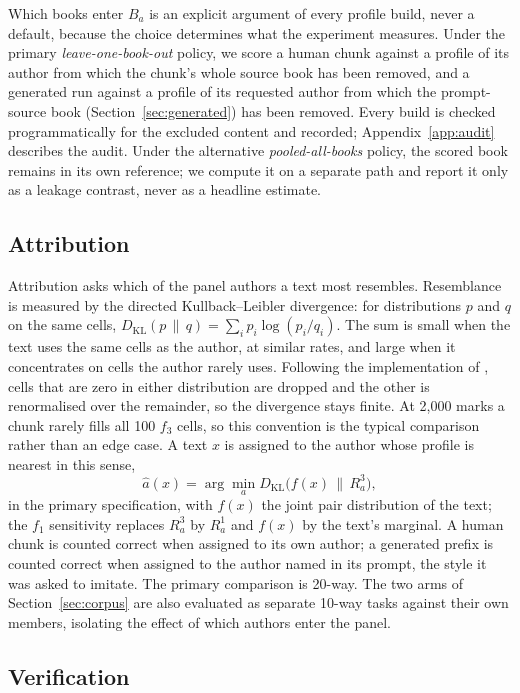 \documentclass[11pt]{article}
\newcommand{\fOne}{\ensuremath{f_1}\xspace}
\newcommand{\fThree}{\ensuremath{f_3}\xspace}
\newcommand{\KL}{D_{\mathrm{KL}}}
\begin{document}
Which books enter \(B_a\) is an explicit argument of every profile build,
never a default, because the choice determines what the experiment
measures.  Under the primary \emph{leave-one-book-out} policy, we score a
human chunk against a profile of its author from which the chunk's whole
source book has been removed, and a generated run against a profile of its
requested author from which the prompt-source book
(Section~\ref{sec:generated}) has been removed.  Every build is checked
programmatically for the excluded content and recorded;
Appendix~\ref{app:audit} describes the audit.  Under
the alternative \emph{pooled-all-books} policy, the scored book remains in
its own reference; we compute it on a separate path and report it only as a
leakage contrast, never as a headline estimate.

\subsection{Attribution}
\label{sec:attribution}

Attribution asks which of the panel authors a text most resembles.
Resemblance is measured by the directed Kullback--Leibler divergence: for
distributions \(p\) and \(q\) on the same cells,
\(\KL(p\,\|\,q) = \sum_i p_i \log(p_i/q_i)\).  The sum is small when the
text uses the same cells as the author, at similar rates, and large when it
concentrates on cells the author rarely uses.  Following the
implementation of \cite{darmon2021}, cells that are zero in either
distribution are dropped and the other is renormalised over the remainder,
so the divergence stays finite.  At 2,000 marks a chunk rarely fills all
100 \fThree cells, so this convention is the typical comparison rather than
an edge case.  A text \(x\) is assigned to the author whose profile is
nearest in this sense,
\[
  \widehat a(x) = \arg\min_{a} \KL\!\big(f(x)\,\|\,R^{3}_{a}\big),
\]
in the primary specification, with \(f(x)\) the joint pair distribution of
the text; the \fOne sensitivity replaces \(R^{3}_{a}\) by \(R^{1}_{a}\)
and \(f(x)\) by the text's marginal.  A human chunk is counted correct when assigned to its own
author; a generated prefix is counted correct when assigned to the author
named in its prompt, the style it was asked to imitate.  The primary
comparison is 20-way.  The two arms of Section~\ref{sec:corpus} are also
evaluated as separate 10-way tasks against their own members, isolating the
effect of which authors enter the panel.

\subsection{Verification}
\label{sec:verification}
\end{document}
